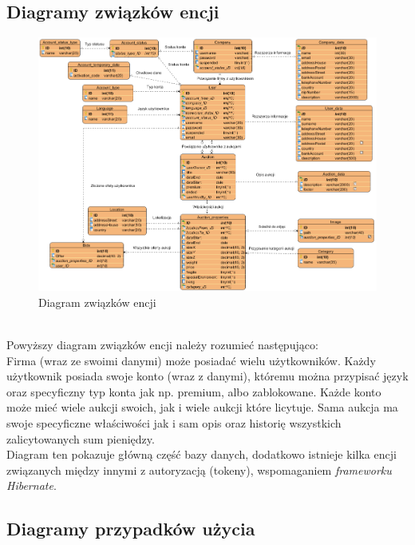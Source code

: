 \documentclass[10pt,titlepage]{article} %
\begin{document}
\subsection{Diagramy związków encji} \label{Diagramy związków encji}
\begin{figure}[H]
\includegraphics[width=\textwidth]{img/sekcja2/bazaDanych}
\caption[Diagram związków encji]{Diagram związków encji}
\end{figure}
\mbox{}\\
Powyższy diagram związków encji należy rozumieć następująco: \\
Firma (wraz ze swoimi danymi) może posiadać wielu użytkowników. Każdy użytkownik posiada swoje konto (wraz z danymi), któremu można przypisać język oraz specyficzny typ konta jak np. premium, albo zablokowane. Każde konto może mieć wiele aukcji swoich, jak i wiele aukcji które licytuje. Sama aukcja ma swoje specyficzne właściwości jak i sam opis oraz historię wszystkich zalicytowanych sum pieniędzy.
\mbox{}\\
Diagram ten pokazuje główną część bazy danych, dodatkowo istnieje kilka encji związanych między innymi z autoryzacją (tokeny), wspomaganiem \textit{frameworku} \textit{Hibernate}.
\newpage
\subsection{Diagramy przypadków użycia}
\end{document}
